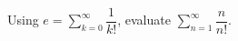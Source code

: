 Using $e=\displaystyle\sum_{k=0}^{\infty}\dfrac{1}{k!}$, evaluate $\displaystyle\sum_{n=1}^{\infty}\dfrac{n}{n!}$.
